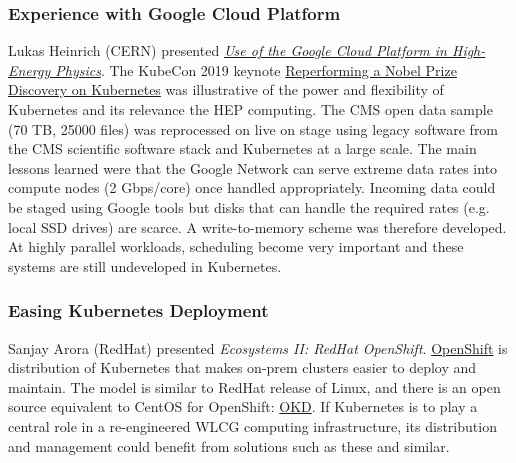 \documentclass[11pt,letterpaper,fleqn]{article}
\begin{document}
\subsubsection{Experience with Google Cloud Platform}
\vspace{0.2cm}
Lukas Heinrich (CERN) presented \href{https://indico.cern.ch/event/820946/contributions/3461593/attachments/1867157/3070768/go}{\textit{Use of the Google Cloud Platform in High-Energy Physics}}. The KubeCon 2019 keynote \href{https://sched.co/MRyv}{Reperforming a Nobel Prize Discovery on Kubernetes} was illustrative of the power and flexibility of Kubernetes and its relevance the HEP computing. The CMS open data sample (70 TB, 25000 files) was reprocessed on live on stage using legacy software from the CMS scientific software stack and Kubernetes at a large scale. The main lessons learned were that the Google Network can serve extreme data rates into compute nodes (2 Gbps/core) once handled appropriately. Incoming data could be staged using Google tools but disks that can handle the required rates (e.g. local SSD drives) are scarce. A write-to-memory scheme was therefore developed. At highly parallel workloads, scheduling become very important and these systems are still undeveloped in Kubernetes.

\subsubsection{Easing Kubernetes Deployment}
\vspace{0.2cm}
Sanjay Arora (RedHat) presented {\it Ecosystems II: RedHat OpenShift}.  \href{https://www.openshift.com/}{OpenShift} is distribution of Kubernetes that makes on-prem clusters easier to deploy and maintain.  The model is similar to RedHat release of Linux, and there is an open source equivalent to CentOS for OpenShift: \href{https://www.okd.io/}{OKD}.  If Kubernetes is to play a central role in a re-engineered WLCG computing infrastructure, its distribution and management could benefit from solutions such as these and similar.

\end{document}
